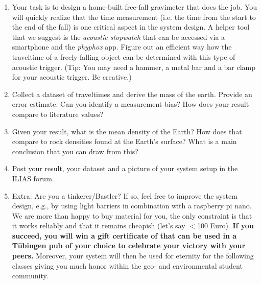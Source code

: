 \documentclass[a4paper,12pt]{article}
\newif\ifanswers
\begin{document}
  \begin{enumerate}[label=(\alph*)]
    \item Your task is to design a home-built free-fall gravimeter that does the job. You will quickly realize that the time measurement (i.e. the time from the start to the end of the fall) is one critical aspect in the system design. A helper tool that we suggest is the \textit{acoustic stopwatch} that can be accessed via a smartphone and the \textit{phyphox} app. Figure out an efficient way how the traveltime of a freely falling object can be determined with this type of acoustic trigger. (Tip: You may need a hammer, a metal bar and a bar clamp for your acoustic trigger. Be creative.)
    
    \item Collect a dataset of traveltimes and derive the mass of the earth. Provide an error estimate. Can you identify a measurement bias? How does your result compare to literature values? 
    
    \item Given your result, what is the mean density of the Earth? How does that compare to rock densities found at the Earth's surface? What is a main conclusion that you can draw from this?

    \item Post your result, your dataset and a picture of your system setup in the ILIAS forum. 

    \item Extra: Are you a tinkerer/Bastler? If so, feel free to improve the system design, e.g., by using light barriers in combination with a raspberry pi nano. We are more than happy to buy material for you, the only constraint is that it works reliably and that it remains cheapish (let's say $<$100 Euro). \textbf{If you succeed, you will win a gift certificate of that can be used in a Tübingen pub of your choice to celebrate your victory with your peers.} Moreover, your system will then be used for eternity for the following classes giving you much honor within the geo- and environmental student community.
  \end{enumerate}
  \ifanswers
  \begin{tcolorbox}[enhanced jigsaw,breakable,pad at break*=1mm,
    colback=blue!5!white,colframe=babyblueeyes,title=Solutions,
    watermark color=white]
    I made a video with a possible setup here: 
    \begin{center}
        \href{https://www.youtube.com/watch?v=q5SdryMp8iw&feature=youtu.be}{Link to Video} 
    \end{center}
    \url{https://www.youtube.com/watch?v=q5SdryMp8iw&feature=youtu.be}
  \end{tcolorbox}
  \fi
\pagebreak
\end{document}
